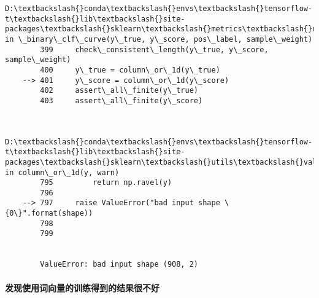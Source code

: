 \documentclass[11pt]{article}
\begin{document}
\begin{Verbatim}[commandchars=\\\{\}]
        D:\textbackslash{}conda\textbackslash{}envs\textbackslash{}tensorflow-t\textbackslash{}lib\textbackslash{}site-packages\textbackslash{}sklearn\textbackslash{}metrics\textbackslash{}ranking.py in \_binary\_clf\_curve(y\_true, y\_score, pos\_label, sample\_weight)
        399     check\_consistent\_length(y\_true, y\_score, sample\_weight)
        400     y\_true = column\_or\_1d(y\_true)
    --> 401     y\_score = column\_or\_1d(y\_score)
        402     assert\_all\_finite(y\_true)
        403     assert\_all\_finite(y\_score)
    

        D:\textbackslash{}conda\textbackslash{}envs\textbackslash{}tensorflow-t\textbackslash{}lib\textbackslash{}site-packages\textbackslash{}sklearn\textbackslash{}utils\textbackslash{}validation.py in column\_or\_1d(y, warn)
        795         return np.ravel(y)
        796 
    --> 797     raise ValueError("bad input shape \{0\}".format(shape))
        798 
        799 
    

        ValueError: bad input shape (908, 2)

    \end{Verbatim}

    \paragraph{发现使用词向量的训练得到的结果很不好}\label{ux53d1ux73b0ux4f7fux7528ux8bcdux5411ux91cfux7684ux8badux7ec3ux5f97ux5230ux7684ux7ed3ux679cux5f88ux4e0dux597d}
\end{document}
